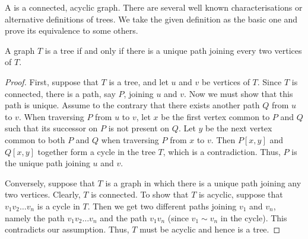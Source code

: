 A  is a connected, acyclic graph. There are several well known characterisations or alternative definitions of trees. We take the given definition as the basic one and prove its equivalence to some others.

\begin{Theorem}\label{thm:UniPath}
A graph $T$ is a tree if and only if there is a unique path joining every two vertices of $T$.
\end{Theorem}
\begin{proof}
First, suppose that $T$ is a tree, and let $u$ and $v$ be vertices of $T$. Since $T$ is connected, there is a path, say $P$, joining $u$ and $v$. Now we must show that this path is unique. Assume to the contrary that there exists another path $Q$ from $u$ to $v$. When traversing $P$ from $u$ to $v$, let $x$ be the first vertex common to $P$ and $Q$ such that its successor on $P$ is not present on $Q$. Let $y$ be the next vertex common to both $P$ and $Q$ when traversing $P$ from $x$ to $v$. Then $P[x,y]$ and $Q[x,y]$ together form a cycle in the tree $T$, which is a contradiction. Thus, $P$ is the unique path joining $u$ and $v$.

Conversely, suppose that $T$ is a graph in which there is a unique path joining any two vertices. Clearly, $T$ is connected. To show that $T$ is acyclic, suppose that $v_1 v_2 \ldots v_n$ is a cycle in $T$. Then we get two different paths joining $v_1$ and $v_n$, namely the path $v_1 v_2 \ldots v_n$ and the path $v_1 v_n$ (since $v_1 \sim v_n$ in the cycle). This contradicts our assumption. Thus, $T$ must be acyclic and hence is a tree.
\end{proof}

